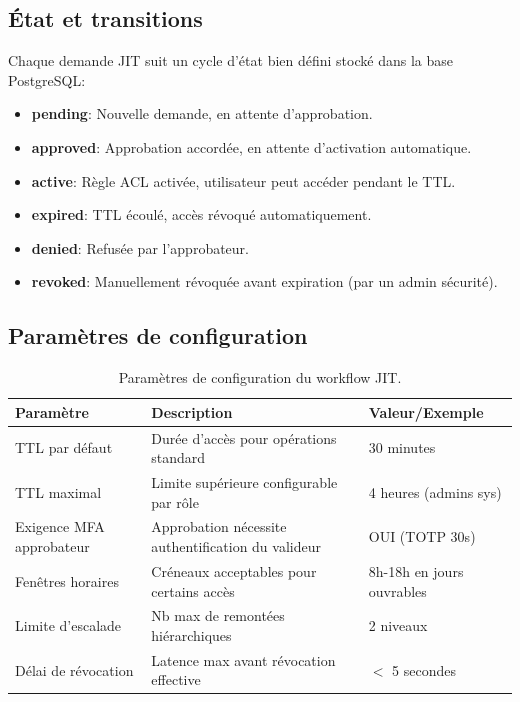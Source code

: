 \subsection{État et transitions}

Chaque demande JIT suit un cycle d'état bien défini stocké dans la base PostgreSQL:

\begin{itemize}
	\item \textbf{pending}: Nouvelle demande, en attente d'approbation.
	\item \textbf{approved}: Approbation accordée, en attente d'activation automatique.
	\item \textbf{active}: Règle ACL activée, utilisateur peut accéder pendant le TTL.
	\item \textbf{expired}: TTL écoulé, accès révoqué automatiquement.
	\item \textbf{denied}: Refusée par l'approbateur.
	\item \textbf{revoked}: Manuellement révoquée avant expiration (par un admin sécurité).
\end{itemize}

\subsection{Paramètres de configuration}

\begin{table}[h]
\centering
\begin{tabularx}{\textwidth}{|l|p{4.5cm}|l|}
\hline
\textbf{Paramètre} & \textbf{Description} & \textbf{Valeur/Exemple} \\
\hline
TTL par défaut & Durée d'accès pour opérations standard & 30 minutes \\
\hline
TTL maximal & Limite supérieure configurable par rôle & 4 heures (admins sys) \\
\hline
Exigence MFA approbateur & Approbation nécessite authentification du valideur & OUI (TOTP 30s) \\
\hline
Fenêtres horaires & Créneaux acceptables pour certains accès & 8h-18h en jours ouvrables \\
\hline
Limite d'escalade & Nb max de remontées hiérarchiques & 2 niveaux \\
\hline
Délai de révocation & Latence max avant révocation effective & $<$ 5 secondes \\
\hline
\end{tabularx}
\caption{Paramètres de configuration du workflow JIT.}
\end{table}

